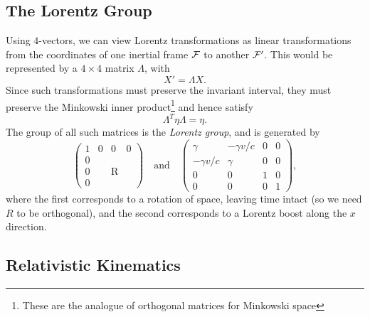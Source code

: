 \documentclass[11pt, a4paper]{scrartcl}
\theoremstyle{definition}
\begin{document}
\subsection*{The Lorentz Group}

Using $4$-vectors, we can view Lorentz transformations as linear transformations from the coordinates of one inertial frame $\mathcal{F}$ to another $\mathcal{F}'$. This would be represented by a $4 \times 4$ matrix $\Lambda$, with
$$
X' = \Lambda X.
$$
Since such transformations must preserve the invariant interval, they must preserve the Minkowski inner product\footnote{These are the analogue of orthogonal matrices for Minkowski space} and hence satisfy
$$
\Lambda^T \eta \Lambda = \eta.
$$
The group of all such matrices is the \emph{Lorentz group}, and is generated by 
$$
\left(\begin{array}{c|ccc}
	1 & 0 & 0 & 0 \\
	\hline 0 & & & \\
	0 & & \mathrm{R} & \\
	0 & & &
	\end{array}\right) 
	\quad \text{and} \quad \left(\begin{array}{cc|cc}
		\gamma & -\gamma v / c & 0 & 0 \\
		-\gamma v / c & \gamma & 0 & 0 \\
		\hline 0 & 0 & 1 & 0 \\
		0 & 0 & 0 & 1
		\end{array}\right),
$$
where the first corresponds to a rotation of space, leaving time intact (so we need $R$ to be orthogonal), and the second corresponds to a Lorentz boost along the $x$ direction.

\subsection*{Relativistic Kinematics}
\end{document}
